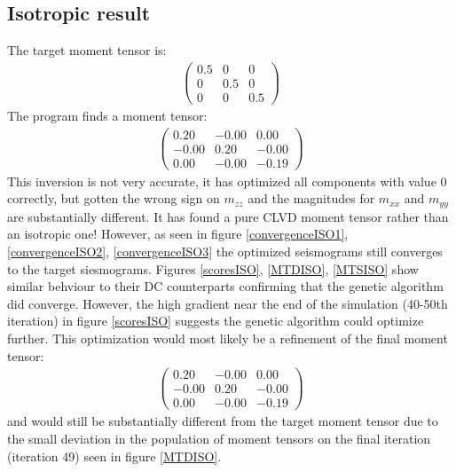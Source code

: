 \documentclass{article}
\begin{document}
\subsection*{Isotropic result}
The target moment tensor is:
\begin{gather}
	\begin{pmatrix}
	0.5 & 0 & 0 \\
	0 & 0.5 & 0 \\
	0 & 0 & 0.5 
	\end{pmatrix}
\end{gather}
The program finds a moment tensor:
\begin{gather}
	\begin{pmatrix}
	0.20 & -0.00 & 0.00 \\
	-0.00 & 0.20 & -0.00 \\
	0.00 & -0.00 & -0.19 
	\end{pmatrix}
\end{gather}
This inversion is not very accurate, it has optimized all components with value 0 correctly, but gotten the wrong sign on $m_{zz}$ and the magnitudes for 
$m_{xx}$ and $m_{yy}$ are substantially different. It has found a pure CLVD moment tensor rather than an isotropic one! However, as seen in figure \ref{convergenceISO1}, \ref{convergenceISO2}, \ref{convergenceISO3} the optimized seismograms still converges to the target siesmograms. Figures \ref{scoresISO}, \ref{MTDISO}, \ref{MTSISO} show similar behviour to their DC counterparts confirming that the genetic algorithm did converge. However, the high gradient near the end of the simulation (40-50th iteration) in figure \ref{scoresISO} suggests the genetic algorithm could optimize further. This optimization would most likely be a refinement of the final moment tensor:
\begin{gather}
	\begin{pmatrix}
	0.20 & -0.00 & 0.00 \\
	-0.00 & 0.20 & -0.00 \\
	0.00 & -0.00 & -0.19 
	\end{pmatrix}
\end{gather}
and would still be substantially different from the target moment tensor due to the small deviation in the population of moment tensors on the final iteration (iteration 49) seen in figure \ref{MTDISO}. 
\end{document}
